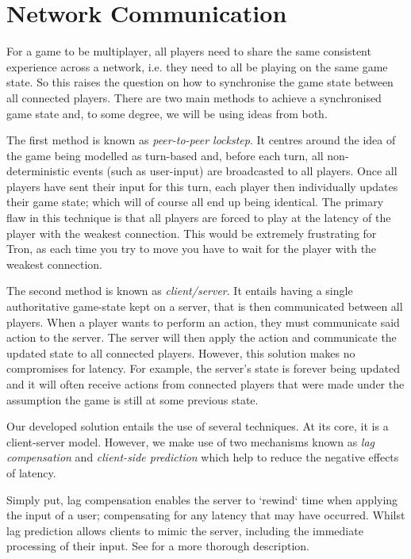 \documentclass{standalone}
\begin{document}
	\section{Network Communication}
		For a game to be multiplayer, all players need to share the same consistent experience across a network, i.e. they need to all be playing on the same game state. So this raises the question on how to synchronise the game state between all connected players. There are two main methods to achieve a synchronised game state and, to some degree, we will be using ideas from both.

		The first method is known as \emph{peer-to-peer lockstep}. It centres around the idea of the game being modelled as turn-based and, before each turn, all non-deterministic events (such as user-input) are broadcasted to all players. Once all players have sent their input for this turn, each player then individually updates their game state; which will of course all end up being identical. The primary flaw in this technique is that all players are forced to play at the latency of the player with the weakest connection. This would be extremely frustrating for Tron, as each time you try to move you have to wait for the player with the weakest connection.

		The second method is known as \emph{client/server}. It entails having a single authoritative game-state kept on a server, that is then communicated between all players. When a player wants to perform an action, they must communicate said action to the server. The server will then apply the action and communicate the updated state to all connected players. However, this solution makes no compromises for latency. For example, the server's state is forever being updated and it will often receive actions from connected players that were made under the assumption the game is still at some previous state.

		Our developed solution entails the use of several techniques. At its core, it is a client-server model. However, we make use of two mechanisms known as \emph{lag compensation}\parencite{LagCompensation} and \emph{client-side prediction}\parencite{LagPrediction} which help to reduce the negative effects of latency.

		Simply put, lag compensation enables the server to `rewind` time when applying the input of a user; compensating for any latency that may have occurred. Whilst lag prediction allows clients to mimic the server, including the immediate processing of their input. See \parencite{LatencyCompensating} for a more thorough description.
\end{document}
